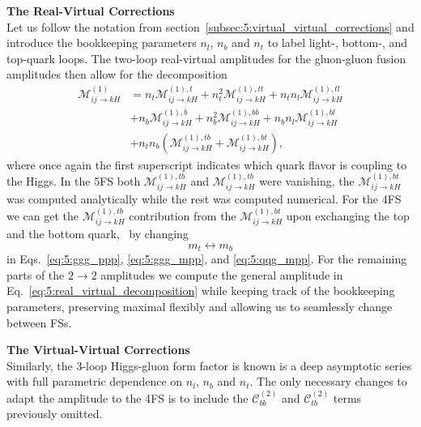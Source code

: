 \textbf{The Real-Virtual Corrections} \\
Let us follow the notation from section~\ref{subsec:5:virtual_virtual_corrections} and introduce the bookkeeping parameters $n_l$, $n_b$ and $n_t$ to label light-, bottom-, and top-quark loops. The two-loop real-virtual amplitudes for the gluon-gluon fusion amplitudes then allow for the decomposition
\begin{equation}
\begin{split}
\mathcal{M}_{ij \rightarrow k H}^{(1)} &= n_t \mathcal{M}_{ij \rightarrow kH}^{(1),t} +  n_t^2 \mathcal{M}_{ij \rightarrow kH}^{(1),tt} +  n_t n_l \mathcal{M}_{ij \rightarrow kH}^{(1),tl} \\
& +  n_b \mathcal{M}_{ij \rightarrow kH}^{(1),b} +  n_b^2 \mathcal{M}_{ij \rightarrow kH}^{(1),bb} +  n_b n_l \mathcal{M}_{ij \rightarrow kH}^{(1),bl} \\
& + n_t n_b \left( \mathcal{M}_{ij \rightarrow k H}^{(1), tb} + \mathcal{M}_{ij \rightarrow k H}^{(1), bt} \right),
\end{split}
\label{eq:5:real_virtual_decomposition}
\end{equation}
where once again the first superscript indicates which quark flavor is coupling to the Higgs. In the 5\acs{FS} both $\mathcal{M}_{ij \rightarrow k H}^{(1), tb}$ and $\mathcal{M}_{ij \rightarrow k H}^{(1), tb}$ were vanishing, the $\mathcal{M}_{ij \rightarrow k H}^{(1), bt}$ was computed analytically while the rest was computed numerical. For the 4\acs{FS} we can get the $\mathcal{M}_{ij \rightarrow k H}^{(1), tb}$ contribution from the $\mathcal{M}_{ij \rightarrow k H}^{(1), bt}$ upon exchanging the top and the bottom quark, \ie\ by changing
\begin{equation}
m_t \longleftrightarrow m_b
\end{equation}
in Eqs.~\eqref{eq:5:ggg_ppp}, \eqref{eq:5:ggg_mpp}, and \eqref{eq:5:qqg_mpp}. For the remaining parts of the $2 \longrightarrow 2$ amplitudes we compute the general amplitude in Eq.~\eqref{eq:5:real_virtual_decomposition} while keeping track of the bookkeeping parameters, preserving maximal flexibly and allowing us to seamlessly change between \acs{FS}s.

\textbf{The Virtual-Virtual Corrections} \\
Similarly, the 3-loop Higgs-gluon form factor is known is a deep asymptotic series with full parametric dependence on $n_l$, $n_b$ and $n_t$. The only necessary changes to adapt the amplitude to the 4\acs{FS} is to include the $\mathcal{C}^{(2)}_{bb}$ and $\mathcal{C}^{(2)}_{tb}$ terms previously omitted.


